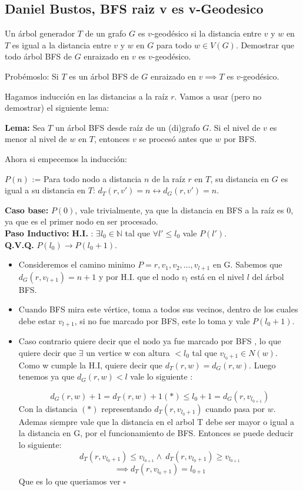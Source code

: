 \documentclass{article}
\begin{document}
\subsection*{Daniel Bustos, BFS raiz v es v-Geodesico}
Un árbol generador $T$ de un grafo $G$ es $v$-geodésico si la distancia entre $v$ y $w$ en $T$ es igual a la distancia entre $v$ y $w$ en $G$ para todo $w \in V(G)$. Demostrar que todo árbol BFS de $G$ enraizado en $v$ es $v$-geodésico.

Probémoslo: Si $T$ es un árbol BFS de $G$ enraizado en $v\implies T$ es $v$-geodésico.

Hagamos inducción en las distancias a la raíz $r$. Vamos a usar (pero no demostrar) el siguiente lema:

\textbf{Lema:} Sea $T$ un árbol BFS desde raíz de un (di)grafo $G$. Si el nivel de $v$ es menor al nivel de $w$ en $T$, entonces $v$ se procesó antes que $w$ por BFS.

Ahora si empecemos la inducción:

$P(n)$ := Para todo nodo a distancia $n$ de la raíz $r$ en $T$, su distancia en $G$ es igual a su distancia en $T$: $d_T(r,v') = n \leftrightarrow d_G(r,v') = n$.

\textbf{Caso base:} $P(0)$, vale trivialmente, ya que la distancia en BFS a la raíz es $0$, ya que es el primer nodo en ser procesado.\\

\textbf{Paso Inductivo:}
\textbf{H.I.} : $\exists l_0 \in \mathbb{N}$ tal que $\forall l' \leq l_0$ vale $P(l')$.\\

\textbf{Q.V.Q.} $P(l_0) \rightarrow P(l_0 + 1)$.
\begin{itemize}
    
\item Consideremos el camino minimo $P = r,v_1,v_2,\ldots,v_{l+1}$ en G. Sabemos que $d_G(r,v_{l+1}) = n + 1$ y  por H.I. que el nodo $v_l$ está en el nivel $l$ del árbol BFS.\\

\item Cuando BFS mira este vértice, toma a todos sus vecinos, dentro de los cuales debe estar $v_{l+1}$, si no fue marcado por BFS, este lo toma y vale $P(l_0 + 1)$. 
\item Caso contrario quiere decir que el nodo ya fue marcado por BFS , lo que quiere decir que $\exists$ un vertice w con altura $< l_0$ tal que $v_{l_0+1} \in N(w)$. Como w cumple la H.I, quiere decir que $d_T(r,w) = d_G(r,w)$. Luego tenemos ya que $d_G(r,w) < l $ vale lo siguiente :

\[d_G(r,w) + 1 = d_T(r,w) + 1 (*) \leq l_0 + 1 = d_G(r,v_{l_{0 + 1}} )\]
Con la distancia $(*)$ representando $d_T(r,v_{l_0 + 1})$ cuando pasa por $w$.
Ademas siempre vale que la distancia en el arbol T debe ser mayor o igual a la distancia en G, por el funcionamiento de BFS. 
Entonces se puede deducir lo siguiente: 
    \[d_T(r,v_{l_0 + 1}) \leq v_{l_{0 + 1 }} \land  \ d_T(r,v_{l_0 + 1}) \geq v_{l_{0 + 1 }}    \]
    \[ \implies d_T(r,v_{l_0 + 1}) = l_{0 + 1 }\]
Que es lo que queriamos ver $\square$


\end{itemize}
\end{document}

